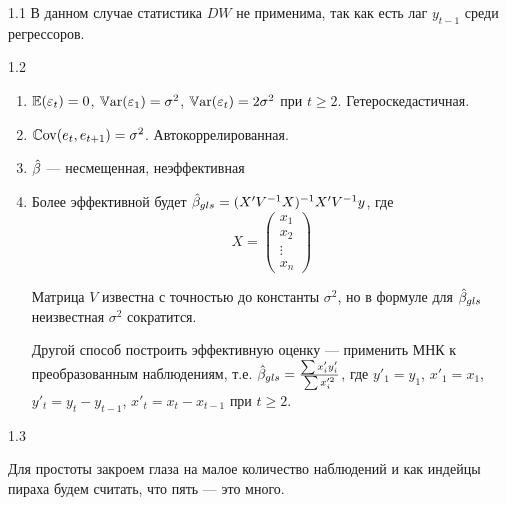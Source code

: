 \protect \hypertarget {soln:1.1}{}
\begin{solution}{{1.1}}
В данном случае статистика $DW$ не применима, так как есть лаг $y_{t-1}$ среди регрессоров.
\end{solution}
\protect \hypertarget {soln:1.2}{}
\begin{solution}{{1.2}}
\begin{enumerate}
\item $\operatorname{\mathbb{E}}(\varepsilon_t)=0$, $\operatorname{\mathbb{V}\mathrm{ar}}(\varepsilon_1)=\sigma^2$, $\operatorname{\mathbb{V}\mathrm{ar}}(\varepsilon_t)=2\sigma^2$ при $t\geq 2$.  Гетероскедастичная.
\item $\operatorname{\mathbb{C}\mathrm{ov}}(e_t,e_{t+1})=\sigma^2$. Автокоррелированная.
\item $\hat{\beta}$ --- несмещенная, неэффективная
\item Более эффективной будет $\hat{\beta}_{gls}=(X'V^{-1}X)^{-1}X'V^{-1}y$, где
\[
X=\begin{pmatrix}
x_1 \\
x_2 \\
\vdots \\
x_n
\end{pmatrix}
\]

Матрица $V$ известна с точностью до константы $\sigma^2$, но в формуле для $\hat{\beta}_{gls}$ неизвестная $\sigma^2$ сократится.

Другой способ построить эффективную оценку --- применить МНК к преобразованным наблюдениям, т.е. $\hat{\beta}_{gls}=\frac{\sum x'_i y'_i}{\sum x_i^{\prime 2}}$, где $y'_1=y_1$, $x'_1=x_1$, $y'_t=y_t-y_{t-1}$, $x'_t=x_t-x_{t-1}$ при $t\geq 2$.
\end{enumerate}
\end{solution}
\protect \hypertarget {soln:1.3}{}
\begin{solution}{{1.3}}

Для простоты закроем глаза на малое количество наблюдений и как индейцы пираха будем считать, что пять --- это много.

\end{solution}
\protect \hypertarget {soln:1.4}{}

